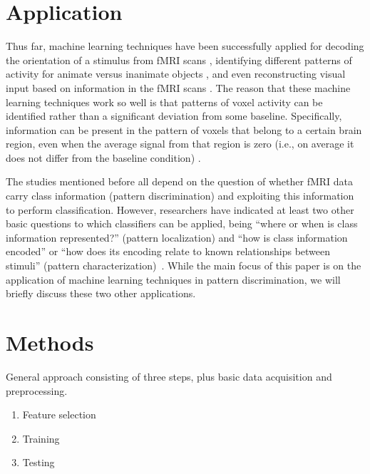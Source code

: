 \documentclass[preprint,journal,11pt]{vgtc}
\begin{document}


\section{Application}
\label{sec:application}
Thus far, machine learning techniques have been successfully applied for decoding the orientation of a stimulus from fMRI scans \cite{ka:2005decoding}, identifying different patterns of activity for animate versus inanimate objects \cite{kr:2008RSA}, and even reconstructing visual input based on information in the fMRI scans \cite{mi:2008re}. The reason that these machine learning techniques work so well is that patterns of voxel activity can be identified rather than a significant deviation from some baseline. Specifically, information can be present in the pattern of voxels that belong to a certain brain region, even when the average signal from that region is zero (i.e., on average it does not differ from the baseline condition) \cite{to:2012rev}.

The studies mentioned before all depend on the question of whether fMRI data carry class
information (pattern discrimination) and exploiting this information to perform classification. However, researchers have indicated at least two other basic questions to which classifiers can be applied, being ``where or when
is class information represented?'' (pattern localization) and ``how is
class information encoded'' or ``how does its encoding relate to known
relationships between stimuli'' (pattern characterization)~\cite{pereira2009machine}. While the main focus of this paper is on the application of machine learning techniques in pattern discrimination, we will briefly discuss these two other applications.


\section{Methods}
\label{sec:methods}
General approach consisting of three steps, plus basic data acquisition and preprocessing.
\begin{enumerate}
  \item Feature selection
  \item Training
  \item Testing
\end{enumerate}
\end{document}
